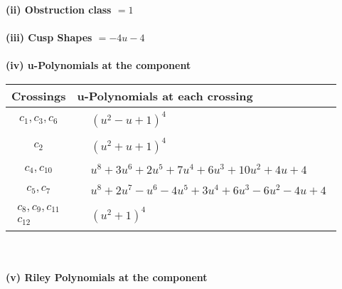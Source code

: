 \documentclass[1p]{elsarticle_modified}
\theoremstyle{definition}
\begin{document}
\flushleft \textbf{(ii) Obstruction class $= 1$}\\~\\
\flushleft \textbf{(iii) Cusp Shapes $= -4 u-4$}\\~\\
\newpage\renewcommand{\arraystretch}{1}
\flushleft \textbf{(iv) u-Polynomials at the component}\newline \\
\begin{tabular}{m{50pt}|m{274pt}}
Crossings & \hspace{64pt}u-Polynomials at each crossing \\
\hline $$\begin{aligned}c_{1},c_{3},c_{6}\end{aligned}$$&$\begin{aligned}
&(u^2- u+1)^4
\end{aligned}$\\
\hline $$\begin{aligned}c_{2}\end{aligned}$$&$\begin{aligned}
&(u^2+u+1)^4
\end{aligned}$\\
\hline $$\begin{aligned}c_{4},c_{10}\end{aligned}$$&$\begin{aligned}
&u^8+3 u^6+2 u^5+7 u^4+6 u^3+10 u^2+4 u+4
\end{aligned}$\\
\hline $$\begin{aligned}c_{5},c_{7}\end{aligned}$$&$\begin{aligned}
&u^8+2 u^7- u^6-4 u^5+3 u^4+6 u^3-6 u^2-4 u+4
\end{aligned}$\\
\hline $$\begin{aligned}c_{8},c_{9},c_{11}\\c_{12}\end{aligned}$$&$\begin{aligned}
&(u^2+1)^4
\end{aligned}$\\
\hline
\end{tabular}\\~\\
\newpage\renewcommand{\arraystretch}{1}
\flushleft \textbf{(v) Riley Polynomials at the component}\newline \\
\end{document}
